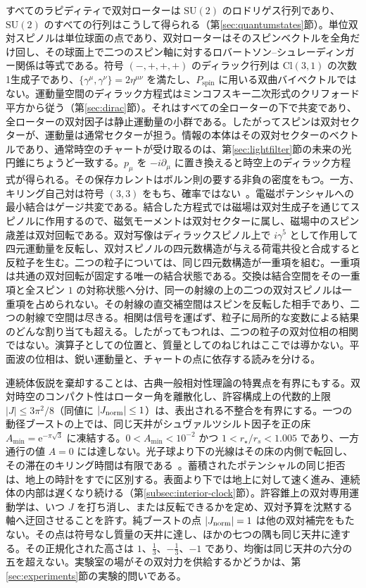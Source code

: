 \documentclass[a4paper]{article}
\begin{document}
すべてのラピディティで双対ローターは $\mathrm{SU}(2)$ のロドリゲス行列であり、$\mathrm{SU}(2)$ のすべての行列はこうして得られる（第\ref{sec:quantumstates}節）。単位双対スピノルは単位球面の点であり、双対ローターはそのスピンベクトルを全角だけ回し、その球面上で二つのスピン軸に対するロバートソン--シュレーディンガー関係は等式である。符号 $(-,+,+,+)$ のディラック行列は $\mathrm{Cl}(3,1)$ の次数1生成子であり、$\{\gamma^\mu,\gamma^\nu\}=2\eta^{\mu\nu}$ を満たし、$P_{\mathrm{spin}}$ に用いる双曲バイベクトルではない。運動量空間のディラック方程式はミンコフスキー二次形式のクリフォード平方から従う（第\ref{sec:dirac}節）。それはすべての全ローターの下で共変であり、全ローターの双対因子は静止運動量の小群である。したがってスピンは双対セクターが、運動量は通常セクターが担う。情報の本体はその双対セクターのベクトルであり、通常時空のチャートが受け取るのは、第\ref{sec:lightfilter}節の未来の光円錐にちょうど一致する。$p_\mu$ を $-i\partial_\mu$ に置き換えると時空上のディラック方程式が得られる。その保存カレントはボルン則の要する非負の密度をもつ。一方、キリング自己対は符号 $(3,3)$ をもち、確率ではない~\cite{dst-d4l}。電磁ポテンシャルへの最小結合はゲージ共変である。結合した方程式では磁場は双対生成子を通じてスピノルに作用するので、磁気モーメントは双対セクターに属し、磁場中のスピン歳差は双対回転である。双対写像はディラックスピノル上で $i\gamma^5$ として作用して四元運動量を反転し、双対スピノルの四元数構造が与える荷電共役と合成すると反粒子を生む。二つの粒子については、同じ四元数構造が一重項を組む。一重項は共通の双対回転が固定する唯一の結合状態である。交換は結合空間をその一重項と全スピン $1$ の対称状態へ分け、同一の射線の上の二つの双対スピノルは一重項を占められない。その射線の直交補空間はスピンを反転した相手であり、二つの射線で空間は尽きる。相関は信号を運ばず、粒子に局所的な変数による結果のどんな割り当ても超える。したがってもつれは、二つの粒子の双対位相の相関ではない。演算子としての位置と、質量としてのねじれはここでは導かない。平面波の位相は、鋭い運動量と、チャートの点に依存する読みを分ける。

連続体仮説を棄却することは、古典一般相対性理論の特異点を有界にもする。双対時空のコンパクト性はローター角を離散化し、許容構成上の代数的上限 $|J|\le 3\pi^2/8$（同値に $|J_{\rm norm}|\le 1$）は、表出される不整合を有界にする。一つの動径ブーストの上では、同じ天井がシュヴァルツシルト因子を正の床 \(A_{\min}=\mathrm{e}^{-\pi\sqrt{3}}\) に凍結する。\(0<A_{\min}<10^{-2}\) かつ \(1<r_\star/r_s<1.005\) であり、一方通行の値 \(A=0\) には達しない。光子球より下の光線はその床の内側で転回し、その滞在のキリング時間は有限である~\cite{dst-lensing}。蓄積されたポテンシャルの同じ拒否は、地上の時計をすでに区別する。表面より下では地上に対して速く進み、連続体の内部は遅くなり続ける（第\ref{subsec:interior-clock}節）。許容錐上の双対専用運動学は、いつ $J$ を打ち消し、または反転できるかを定め、双対予算を沈黙する軸へ迂回させることを許す。純ブーストの点 $|J_{\rm norm}|=1$ は他の双対補完をもたない。その点は符号なし質量の天井に達し、ほかの七つの隅も同じ天井に達する。その正規化された高さは $1$、$\frac13$、$-\frac13$、$-1$ であり、均衡は同じ天井の六分の五を超えない。実験室の場がその双対力を供給するかどうかは、第\ref{sec:experiments}節の実験的問いである。
\end{document}
